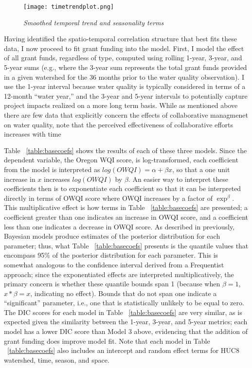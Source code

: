 \documentclass[11pt,a4paper,titlepage]{article}
\begin{document}
\begin{figure}[!htbp]
\graphicspath{ {`/Users/TScott/Google\space Drive/quinalt/APPAM_2014/'}}
\label{fig:timetrend}
\noindent
\texttt{[image: timetrendplot.png]}
\caption{\textit{Smoothed temporal trend and seasonality terms}}
\end{figure}

Having identified the spatio-temporal correlation structure that best fits these data, I now proceed to fit grant funding into the model. First, I model the effect of all grant funds, regardless of type, computed using rolling 1-year, 3-year, and 5-year sums (e.g., where the 3-year sum represents the total grant funds provided in a given watershed for the 36 months prior to the water quality observation). I use the 1-year interval because water quality is typically considered in terms of a 12-month ``water year,'' and the 3-year and 5-year intervals to potentially capture project impacts realized on a more long term basis. While as mentioned above there are few data that explicitly concern the effects of collaborative managmenet on water quality, \textcite[][p. 281]{lubell2009} note that the perceived effectiveness of collaborative efforts increases with time \parencite[see also][]{leach2002, leach2006}


Table ~\ref{table:basecoefs} shows the results of each of these three models. Since the dependent variable, the Oregon WQI score, is log-transformed, each coefficient from the model is interpreted as $log(OWQI) =\alpha+\beta x$, so that a one unit increase in $x$ increases $log(OWQI)$ by $\beta$. An easier way to interpret these coefficients then is to exponentiate each coefficient so that it can be interpreted directly in terms of OWQI score where OWQI increases by a factor of $\exp^{\beta}$. This multiplicative effect is how terms in Table ~\ref{table:basecoefs} are presented; a coefficient greater than one indicates an increase in OWQI score, and a coefficient less than one indicates a decrease in OWQI score. As described in previously, Bayesian models produce estimates of the posterior distribution for each parameter; thus, what Table ~\ref{table:basecoefs} presents is the quantile values that encompass 95\% of the posterior distribution for each parameter. This is somewhat analogous to the confidence interval derived from a Frequentist approach; since the exponentiated effects are interpreted multiplicatively, the primary concern is whether these quantile bounds span 1 (because when $\beta=1$, $x*\beta=x$, indicating no effect). Bounds that do not span one indicate a “significant” parameter, i.e., one that is statistically unlikely to be equal to zero. The DIC scores for each model in Table ~\ref{table:basecoefs} are very similar, as is expected given the similarity between the 1-year, 3-year, and 5-year metrics; each model has a lower DIC score than Model 3 above, evidencing that the addition of grant funding does improve model fit. Note that each model in Table ~\ref{table:basecoefs} also includes an intercept and random effect terms for HUC8 watershed, time, season, and space.
\end{document}
